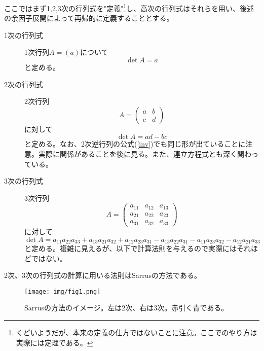 \documentclass[10pt]{jsreport}
\theoremstyle{definition}%
\numberwithin{equation}{section}%
\begin{document}
ここではまず1,2,3次の行列式を"定義"\footnote{くどいようだが、本来の定義の仕方ではないことに注意。ここでのやり方は実際には定理である。}し、高次の行列式はそれらを用い、後述の余因子展開によって再帰的に定義することとする。

\begin{description}
  \item[1次の行列式] 1次行列$A=(a)$について
  \begin{equation}
  \det A = a  
  \end{equation}
と定める。
\item[2次の行列式] 2次行列 
\begin{equation}
A=\begin{pmatrix}
  a & b \\
  c & d
\end{pmatrix}  
\end{equation}
に対して
\begin{equation}
  \det A =ad- bc
\end{equation}
と定める。なお、2次逆行列の公式(\ref{inv})でも同じ形が出ていることに注意。実際に関係があることを後に見る。また、連立方程式とも深く関わっている。
\item[3次の行列式] 3次行列 
\begin{equation}
A=\begin{pmatrix}
  a_{11} & a_{12} & a_{13} \\
  a_{21} & a_{22} & a_{23} \\
  a_{31} & a_{32} & a_{33}
\end{pmatrix}  
\end{equation}
に対して
\begin{equation}
  \det A =a_{11}a_{22}a_{33}+a_{13}a_{21}a_{32}+a_{12}a_{23}a_{31}-a_{13}a_{22}a_{31}-a_{11}a_{23}a_{32}-a_{12}a_{21}a_{33}
\end{equation}
と定める。複雑に見えるが、以下で計算法則を与えるので実際にはそれほどではない。
\end{description}
2次、3次の行列式の計算に用いる法則はSarrusの方法である。
\begin{figure}[H]
  \centering
  \texttt{[image: img/fig1.png]}
  \caption{Sarrusの方法のイメージ。左は2次、右は3次。赤引く青である。}
  \label{fig1}
\end{figure}
\end{document}
